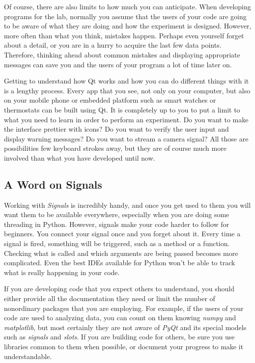 Of course, there are also limits to how much you can anticipate. When
developing programs for the lab, normally you assume that the users of
your code are going to be aware of what they are doing and how the
experiment is designed. However, more often than what you think,
mistakes happen. Perhaps even yourself forget about a detail, or you are
in a hurry to acquire the last few data points. Therefore, thinking
ahead about common mistakes and displaying appropriate messages can save
you and the users of your program a lot of time later on.

Getting to understand how Qt works and how you can do different things
with it is a lengthy process. Every app that you see, not only on your
computer, but also on your mobile phone or embedded platform such as
smart watches or thermostats can be built using Qt. It is completely up
to you to put a limit to what you need to learn in order to perform an
experiment. Do you want to make the interface prettier with icons? Do
you want to verify the user input and display warning messages? Do you
want to stream a camera signal? All those are possibilities few keyboard
strokes away, but they are of course much more involved than what you
have developed until now.

\subsection{A Word on Signals}\label{a-word-onsignals}
Working with \emph{Signals} is incredibly handy, and once you get used
to them you will want them to be available everywhere, especially when
you are doing some threading in Python. However, signals make your code
harder to follow for beginners. You connect your signal once and you
forget about it. Every time a signal is fired, something will be
triggered, such as a method or a function. Checking what is called and
which arguments are being passed becomes more complicated. Even the best
IDEs available for Python won't be able to track what is really
happening in your code.

If you are developing code that you expect others to understand, you
should either provide all the documentation they need or limit the
number of nonordinary packages that you are employing. For example, if
the users of your code are used to analyzing data, you can count on them
knowing \emph{numpy} and \emph{matplotlib}, but most certainly they are
not aware of \emph{PyQt} and its special models such as \emph{signals}
and \emph{slots}. If you are building code for others, be sure you use
libraries common to them when possible, or document your progress to
make it understandable.

